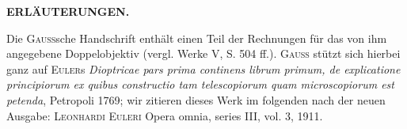 \clearpage\begingroup
{}
\makeatletter\tagsleft@true\let\veqno\@@leqno\makeatother
\begin{center}\textbf{ERLÄUTERUNGEN.}\end{center}
\noindent\hspace*{\parindent}Die \textsc{Gauss}sche Handschrift enthält einen Teil der Rechnungen für das von ihm angegebene Doppelobjektiv (vergl. Werke V, S. 504 ff.). \textsc{Gauss} stützt sich hierbei ganz auf \textsc{Euler}s \textit{Dioptricae pars prima continens librum primum, de explicatione principiorum ex quibus constructio tam telescopiorum quam microscopiorum est petenda}, Petropoli 1769; wir zitieren dieses Werk im folgenden nach der neuen Ausgabe: \textsc{Leonhardi Euleri} Opera omnia, series III, vol. 3, 1911.

